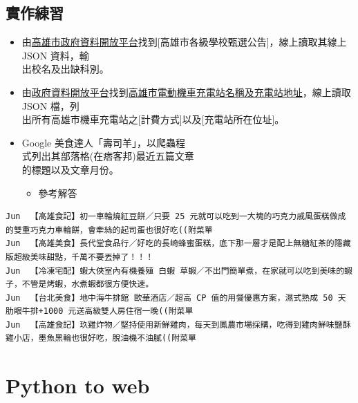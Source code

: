 \documentclass[a4paper,12pt]{article}
\begin{document}
\subsection{實作練習}
\label{sec:org17ff951}
\begin{itemize}
\item 由\href{https://data.kcg.gov.tw/dataset?res\_format=JSON}{高雄市政府資料開放平台}找到[高雄市各級學校甄選公告]，線上讀取其線上 JSON 資料，輸\\
出校名及出缺科別。\\
\item 由\href{https://data.gov.tw/}{政府資料開放平台}找到\href{https://data.gov.tw/dataset/107578}{高雄市電動機車充電站名稱及充電站地址}，線上讀取 JSON 檔，列\\
出所有高雄市機車充電站之[計費方式]以及[充電站所在位址]。\\
\item Google 美食達人「壽司羊」，以爬蟲程\\
式列出其部落格(在痞客邦)最近五篇文章\\
的標題以及文章月份。\\

\begin{itemize}
\item 參考解答\\
\end{itemize}
\end{itemize}
\begin{verbatim}
Jun  【高雄食記】初一車輪燒紅豆餅／只要 25 元就可以吃到一大塊的巧克力戚風蛋糕做成的雙重巧克力車輪餅，會牽絲的起司蛋也很好吃((附菜單
Jun  【高雄美食】長代堂食品行／好吃的長崎蜂蜜蛋糕，底下那一層才是配上無糖紅茶的隱藏版超級美味甜點，千萬不要丟掉了！！！
Jun  【冷凍宅配】蝦大俠室內有機養殖 白蝦 草蝦／不出門簡單煮，在家就可以吃到美味的蝦子，不管是烤蝦，水煮蝦都很方便快速。
Jun  【台北美食】地中海牛排館 歐華酒店／超高 CP 值的用餐優惠方案，濕式熟成 50 天肋眼牛排+1000 元送高級雙人房住宿一晚((附菜單
Jun  【高雄食記】玖雞炸物／堅持使用新鮮雞肉，每天到鳳農市場採購，吃得到雞肉鮮味鹽酥雞小店，墨魚黑輪也很好吃，脫油機不油膩((附菜單
\end{verbatim}


\newpage

\section{Python to web}
\label{sec:org261a6c9}
\end{document}
